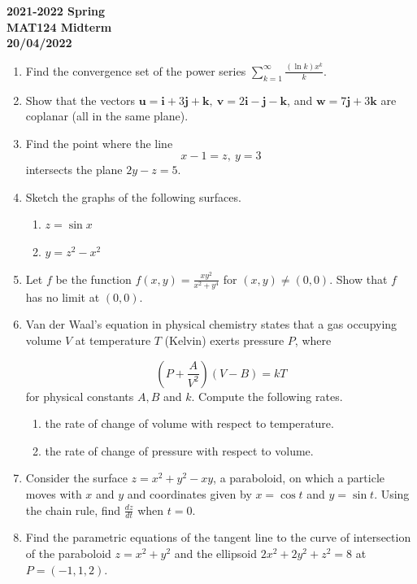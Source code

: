 \documentclass[a4paper, 12pt]{article}
\begin{document}
\pagestyle{empty}

\begin{center}
\textbf{2021-2022 Spring \\MAT124 Midterm\\20/04/2022}
\end{center}

\begin{enumerate}[leftmargin=*,label=\textbf{\arabic*.}]
\item Find the convergence set of the power series $\displaystyle\sum_{k=1}^\infty\frac{(\ln k)x^k}k$.

\item Show that the vectors $\mathbf{u}=\mathbf{i}+3\mathbf{j}+\mathbf{k},\:\mathbf{v}=2\mathbf{i}-\mathbf{j}-\mathbf{k}$, and $\mathbf{w}=7\mathbf{j}+3\mathbf{k}$ are coplanar (all in the same plane).

\item Find the point where the line
\[x-1=z,\:y=3\]
intersects the plane $2y-z=5$.

\item Sketch the graphs of the following surfaces.

\begin{enumerate}[leftmargin=*,label=\textbf{\alph*.}]
\item $z=\sin x$
\item $y=z^2-x^2$
\end{enumerate}

\item Let $f$ be the function $\displaystyle f(x,y)=\frac{xy^2}{x^2+y^4}$ for $(x,y)\neq(0,0)$. Show that $f$ has no limit at $(0,0)$.

\item Van der Waal's equation in physical chemistry states that a gas occupying volume $V$ at temperature $T$ (Kelvin) exerts pressure $P$, where

\[\left(P+\frac A{V^2}\right)(V-B)=kT\]
for physical constants $A, B$ and $k$. Compute the following rates.

\begin{enumerate}[leftmargin=*,label=\textbf{\alph*.}]
\item the rate of change of volume with respect to temperature.
\item the rate of change of pressure with respect to volume.
\end{enumerate}

\item Consider the surface $z=x^2+y^2-xy$, a paraboloid, on which a particle moves with $x$ and $y$ and coordinates given by $x=\cos t$ and $y=\sin t$. Using the chain rule, find $\displaystyle\frac{dz}{dt}$ when $t=0$. 

\item Find the parametric equations of the tangent line to the curve of intersection of the paraboloid $z=x^2+y^2$ and the ellipsoid $2x^2+2y^2+z^2=8$ at $P=(-1,1,2)$.
\end{enumerate}
\end{document}
